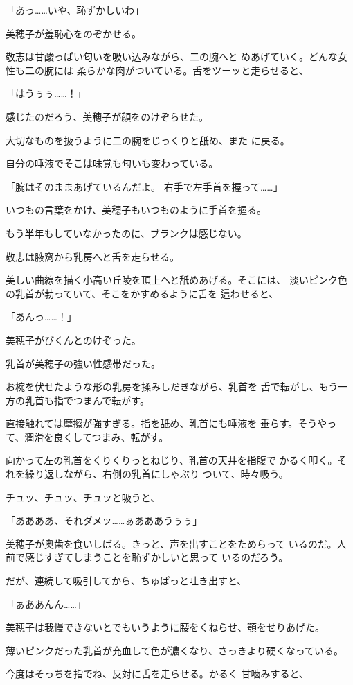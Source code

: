 ﻿\documentclass[
    book,tate,
    line_length=30zw,
    jafontsize=12pt,
    paper=b5j,
    landscape,
    ]{jlreq}
\begin{document}
「あっ……いや、恥ずかしいわ」

美穂子が羞恥心をのぞかせる。

敬志は甘酸っぱい匂いを吸い込みながら、二の腕へと
めあげていく。どんな女性も二の腕には
柔らかな肉がついている。舌をツーッと走らせると、

「はうぅぅ……！」

感じたのだろう、美穂子が顔をのけぞらせた。

大切なものを扱うように二の腕をじっくりと舐め、また
に戻る。

自分の唾液でそこは味覚も匂いも変わっている。

「腕はそのままあげているんだよ。 右手で左手首を握って……」

いつもの言葉をかけ、美穂子もいつものように手首を握る。

もう半年もしていなかったのに、ブランクは感じない。

敬志は腋窩から乳房へと舌を走らせる。

美しい曲線を描く小高い丘陵を頂上へと舐めあげる。そこには、
淡いピンク色の乳首が勃っていて、そこをかすめるように舌を
這わせると、

「あんっ……！」

美穂子がびくんとのけぞった。

乳首が美穂子の強い性感帯だった。

お椀を伏せたような形の乳房を揉みしだきながら、乳首を
舌で転がし、もう一方の乳首も指でつまんで転がす。

直接触れては摩擦が強すぎる。指を舐め、乳首にも唾液を
垂らす。そうやって、潤滑を良くしてつまみ、転がす。

向かって左の乳首をくりくりっとねじり、乳首の天井を指腹で
かるく叩く。それを繰り返しながら、右側の乳首にしゃぶり
ついて、時々吸う。

チュッ、チュッ、チュッと吸うと、

「ああああ、それダメッ……ぁあああうぅぅ」

美穂子が奥歯を食いしばる。きっと、声を出すことをためらって
いるのだ。人前で感じすぎてしまうことを恥ずかしいと思って
いるのだろう。

だが、連続して吸引してから、ちゅぱっと吐き出すと、

「ぁああんん……」

美穂子は我慢できないとでもいうように腰をくねらせ、顎をせりあげた。

薄いピンクだった乳首が充血して色が濃くなり、さっきより硬くなっている。

今度はそっちを指でね、反対に舌を走らせる。かるく
甘噛みすると、
\end{document}
